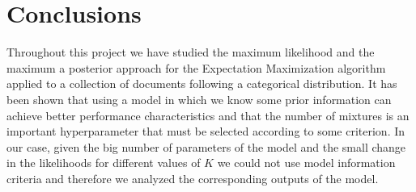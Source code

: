\documentclass[12pt]{article}
\begin{document}
\section{Conclusions}

Throughout this project we have studied the maximum likelihood and the maximum a posterior approach for the Expectation Maximization algorithm applied to a collection of documents following a categorical distribution. It has been shown that using a model in which we know some prior information can achieve better performance characteristics and that the number of mixtures is an important hyperparameter that must be selected according to some criterion. In our case, given the big number of parameters of the model and the small change in the likelihoods for different values of $K$ we  could not use model information criteria and therefore we analyzed the corresponding outputs of the model.



\clearpage
\nocite{*}
\printbibliography
\end{document}
